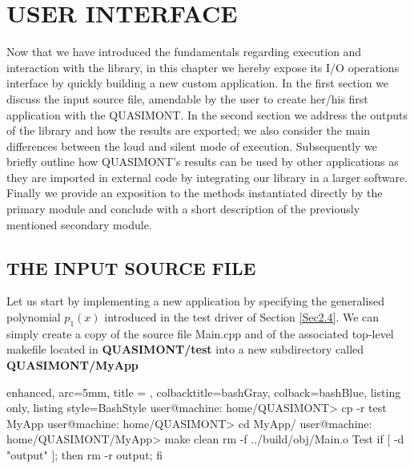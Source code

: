 \documentclass[a4paper, twosided]{book}
\begin{document}
\chapter[User interface]{\Huge \ttfamily USER INTERFACE}

Now that we have introduced the fundamentals regarding execution and interaction with the library, in this chapter we hereby expose its I/O operations interface by quickly building a new custom application. In the first section we discuss the input source file, amendable by the user to create her/his first application with the QUASIMONT. In the second section we address the outputs of the library and how the results are exported; we also consider the main differences between the loud and silent mode of execution. Subsequently we briefly outline how QUASIMONT's results can be used by other applications as they are imported in external code by integrating our library in a larger software. Finally we provide an exposition to the methods instantiated directly by the primary module and conclude with a short description of the previously mentioned secondary module.

\section[The input source file]{\changefont THE INPUT SOURCE FILE}\label{Sec3.1}

\noindent
Let us start by implementing a new application by specifying the generalised polynomial $p_1(x)$ introduced in the test driver of Section \ref{Sec2.4}. We can simply create a copy of the source file \colorbox{poliGrayBlue}{Main.cpp} and of the associated top-level makefile located in  \colorbox{poliGrayBlue}{\textbf{QUASIMONT/test}} into a new subdirectory called \colorbox{poliGrayBlue}{\textbf{QUASIMONT/MyApp}}

\vspace{0.2cm}
\begin{tcblisting}{enhanced,
                   arc=5mm,
                   title = \color{black}{\large \ttfamily Creation of application's directory},
                   colbacktitle=bashGray,
                   colback=bashBlue,
                   listing only,
                   listing style=BashStyle}
user@machine: home/QUASIMONT> cp -r test MyApp
user@machine: home/QUASIMONT> cd MyApp/
user@machine: home/QUASIMONT/MyApp> make clean
rm -f ../build/obj/Main.o Test
if [ -d "output" ]; then rm -r output; fi 
\end{tcblisting}
\vspace{0.3cm}
\end{document}

